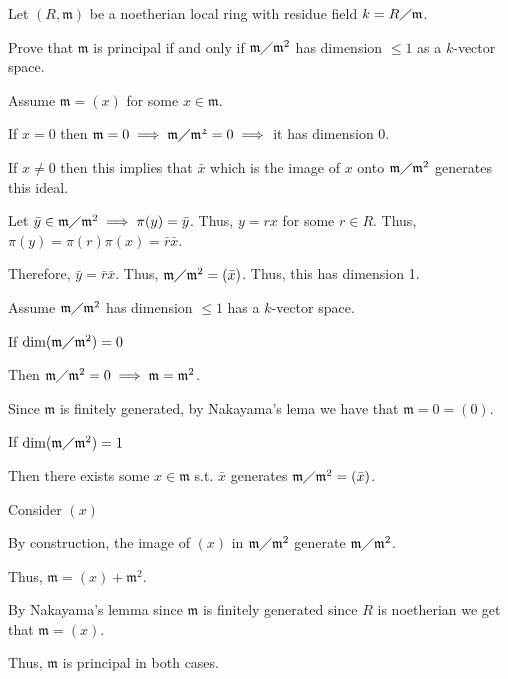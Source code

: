 \documentclass[12pt, letterpaper]{article}
\newcommand{\mf}[1]{\mathfrak{#1}}
\begin{document}
\begin{problem}{}
    Let $(R, \mf{m})$ be a noetherian local ring with residue field $k = R \diagup \mf{m}$.
\end{problem}
\begin{subproblem}{}
    Prove that $\mf{m}$ is principal if and only if $\mf{m} \diagup \mf{m}^2$ has dimension $\leq 1$ as a $k$-vector space.
\end{subproblem}
\begin{problemproof}
    Assume $\mf{m}=(x)$ for some $x \in \mf{m}$.

    If $x = 0$ then $\mf{m}=0 \implies \mf{m} \diagup \mf{m^2} = 0 \implies$ it has dimension 0.

    If $x \neq 0$ then this implies that $\bar{x}$ which is the image of $x$ onto $\mf{m} \diagup \mf{m}^2$ generates this ideal.

    Let $\bar{y} \in \mf{m} \diagup \mf{m}^2 \implies \pi(y)=\bar{y}$. Thus, $y=rx$ for some $r \in R$. Thus, $\pi(y)=\pi(r)\pi(x)=\bar{r}\bar{x}$.

    Therefore, $\bar{y}=\bar{r}\bar{x}$. Thus, $\mf{m} \diagup \mf{m}^2 = (\bar{x})$. Thus, this has dimension 1.

    Assume $\mf{m} \diagup \mf{m}^2$ has dimension $\leq 1$ has a $k$-vector space.

    If $\dim (\mf{m} \diagup \mf{m}^2) = 0$

    Then $\mf{m} \diagup \mf{m}^2 = 0 \implies \mf{m} = \mf{m}^2$.

    Since $\mf{m}$ is finitely generated, by Nakayama's lema we have that $\mf{m}=0=(0)$.

    If $\dim (\mf{m} \diagup \mf{m}^2) = 1$

    Then there exists some $x \in \mf{m}$ s.t. $\bar{x}$ generates $\mf{m} \diagup \mf{m}^2=(\bar{x})$.

    Consider $(x)$

    By construction, the image of $(x)$ in $\mf{m} \diagup \mf{m}^2$ generate $\mf{m} \diagup \mf{m}^2$.

    Thus, $\mf{m}=(x)+\mf{m}^2$.

    By Nakayama's lemma since $\mf{m}$ is finitely generated since $R$ is noetherian we get that $\mf{m}=(x)$.

    Thus, $\mf{m}$ is principal in both cases.
\end{problemproof}
\end{document}
